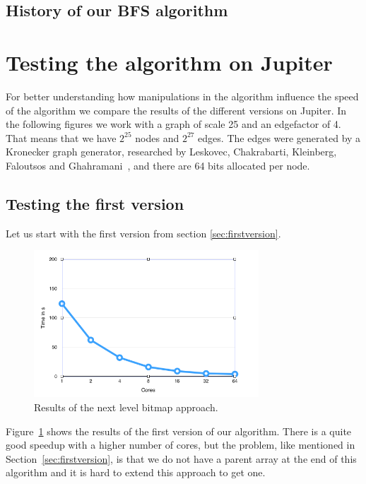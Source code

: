\documentclass[12pt,a4paper]{article}
\begin{document}
\subsection{History of our BFS algorithm}
\label{sec:versions}


\section{Testing the algorithm on Jupiter}
\label{sec:testing}

For better understanding how manipulations in the algorithm influence the speed of the algorithm we compare the results of the different versions on Jupiter. In the following figures we work with a graph of scale 25 and an edgefactor of 4. That means that we have \(2^{25}\) nodes and \(2^{27}\) edges. The edges were generated by a Kronecker graph generator, researched by Leskovec, Chakrabarti, Kleinberg, Faloutsos and Ghahramani~\cite{kronecker}, and there are 64 bits allocated per node.

\subsection{Testing the first version}

Let us start with the first version from section \ref{sec:firstversion}.

\begin{figure}[!ht]
   \centering
   \includegraphics[width=0.75\textwidth]{next_level}
   \caption{Results of the next level bitmap approach.}
   \label{fig:nextbitmap}
\end{figure}

Figure~\ref{fig:nextbitmap} shows the results of the first version of our algorithm. There is a quite good speedup with a higher number of cores, but the problem, like mentioned in Section~\ref{sec:firstversion}, is that we do not have a parent array at the end of this algorithm and it is hard to extend this approach to get one.
\end{document}
